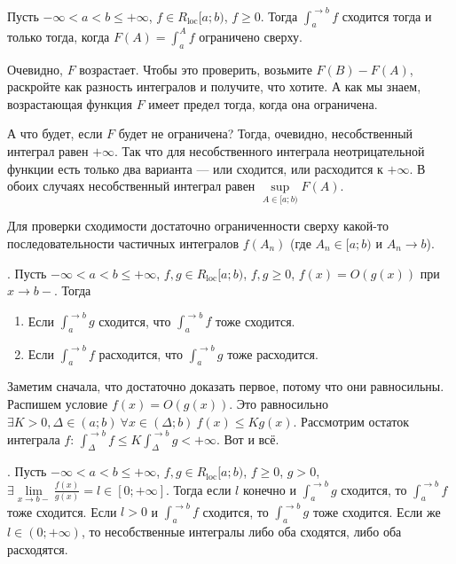 \documentclass{article}
\begin{document}
    \begin{itemize}
        \thm Пусть $-\infty<a<b\leqslant+\infty$, $f\in R_{\mathrm{loc}}[a;b)$, $f\geqslant0$. Тогда $\int_a^{\to b}f$ сходится тогда и только тогда, когда $F(A)=\int_a^Af$ ограничено сверху.
        \begin{Proof}
            Очевидно, $F$ возрастает. Чтобы это проверить, возьмите $F(B)-F(A)$, раскройте как разность интегралов и получите, что хотите. А как мы знаем, возрастающая функция $F$ имеет предел тогда, когда она ограничена.
        \end{Proof}
        \begin{Comment}
            А что будет, если $F$ будет не ограничена? Тогда, очевидно, несобственный интеграл равен $+\infty$. Так что для несобственного интеграла неотрицательной функции есть только два варианта --- или сходится, или расходится к $+\infty$. В обоих случаях несобственный интеграл равен $\sup\limits_{A\in[a;b)}F(A)$.
        \end{Comment}
        \begin{Comment}
            Для проверки сходимости достаточно ограниченности сверху какой-то последовательности частичных интегралов $f(A_n)$ (где $A_n\in[a;b)$ и $A_n\to b$).
        \end{Comment}
        \thm {}. Пусть $-\infty<a<b\leqslant+\infty$, $f,g\in R_{\mathrm{loc}}[a;b)$, $f,g\geqslant0$, $f(x)=O(g(x))$ при $x\to b-$. Тогда
        \begin{enumerate}
            \item Если $\int_a^{\to b}g$ сходится, что $\int_a^{\to b}f$ тоже сходится.
            \item Если $\int_a^{\to b}f$ расходится, что $\int_a^{\to b}g$ тоже расходится.
        \end{enumerate}
        \begin{Proof}
            Заметим сначала, что достаточно доказать первое, потому что они равносильны.\\
            Распишем условие $f(x)=O(g(x))$. Это равносильно $\exists K>0,\Delta\in(a;b)~\forall x\in(\Delta;b)~f(x)\leqslant Kg(x)$. Рассмотрим остаток интеграла $f$: $\int_\Delta^{\to b}f\leqslant K\int_\Delta^{\to b}g<+\infty$. Вот и всё.
        \end{Proof}
        \thm {}. Пусть $-\infty<a<b\leqslant+\infty$, $f,g\in R_{\mathrm{loc}}[a;b)$, $f\geqslant0$, $g>0$, $\exists\lim\limits_{x\to b-}\frac{f(x)}{g(x)}=l\in[0;+\infty]$. Тогда если $l$ конечно и $\int_a^{\to b}g$ сходится, то $\int_a^{\to b}f$ тоже сходится. Если $l>0$ и $\int_a^{\to b}f$ сходится, то $\int_a^{\to b}g$ тоже сходится. Если же $l\in(0;+\infty)$, то несобственные интегралы либо оба сходятся, либо оба расходятся.

\end{itemize}
\end{document}
